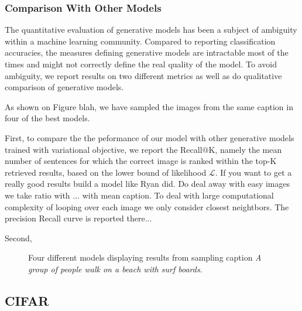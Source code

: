 \documentclass{article} %
\newcommand{\loss}{\mathcal{L}}
\begin{document}
\subsubsection{Comparison With Other Models}
The quantitative evaluation of generative models has been a subject of ambiguity within a machine learning community. Compared to reporting classification accuracies, the measures defining generative models are intractable most of the times and might not correctly define the real quality of the model. To avoid ambiguity, we report results on two different metrics as well as do qualitative comparison of generative models.

As shown on Figure blah, we have sampled the images from the same caption in four of the best models.

First, to compare the the peformance of our model with other generative models trained with variational objective, we report the Recall$@$K, namely the mean number of sentences for which the correct image is ranked within the top-K retrieved results, based on the lower bound of likelihood $\loss$. If you want to get a really good results build a model like Ryan did. Do deal away with easy images we take ratio with ... with mean caption. To deal with large computational complexity of looping over each image we only consider closest neightbors. The precision Recall curve is reported there...

Second, 

\vspace{-0.3cm}
\begin{figure}[!t]
\captionsetup[subfigure]{labelformat=empty}
\begin{center}
\quad
%
\quad
%
\quad
%
\quad
%
\end{center}
\caption{Four different models displaying results from sampling caption \textit{A group of people walk on a beach with surf boards.}}
\label{fig:label}
\vspace{-0.2cm}
\end{figure}

\subsection{CIFAR}



\end{document}
